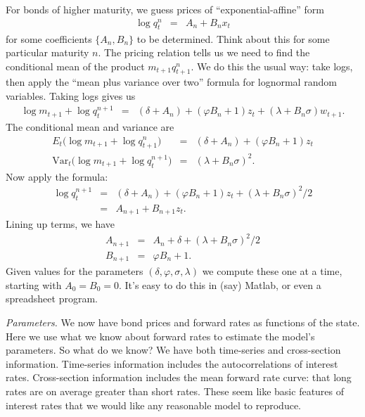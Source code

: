 \documentclass[11pt]{article}
\begin{document}
For bonds of higher maturity, we
guess prices of ``exponential-affine'' form
\begin{eqnarray*}
    \log q^n_t &=& A_n + B_n x_t
\end{eqnarray*}
for some coefficients $\{ A_n, B_n\}$ to be determined.
Think about this for some particular maturity $n$.
The pricing relation tells us we
need to find the conditional mean of the product
$m_{t+1} q^n_{t+1}$.
We do this the usual way:  take logs,
then apply the ``mean plus variance over two'' formula for
lognormal random variables.
Taking logs gives us
\begin{eqnarray*}
    \log m_{t+1} + \log q^{n+1}_t &=&
            (\delta + A_n) + (\varphi B_n +1) z_t + (\lambda + B_n \sigma) w_{t+1} .
\end{eqnarray*}
The conditional mean and variance are
\begin{eqnarray*}
   E_t \big( \log m_{t+1} + \log q^{n}_{t+1} \big) &=&
            (\delta + A_n) + (\varphi B_n + 1) z_t \\
   \mbox{Var}_t \big( \log m_{t+1} + \log q^{n+1}_t \big) &=&
            (\lambda + B_n \sigma)^2 .
\end{eqnarray*}
Now apply the formula:
\begin{eqnarray*}
    \log q^{n+1}_t &=&
            (\delta + A_n) + (\varphi B_n + 1) z_t + (\lambda + B_n \sigma)^2/2 \\
                &=& A_{n+1} + B_{n+1} z_t.
\end{eqnarray*}
Lining up terms, we have
\begin{eqnarray*}
    A_{n+1} &=& A_n + \delta + (\lambda + B_n\sigma)^2/2 \\
    B_{n+1} &=& \varphi B_n + 1 .
\end{eqnarray*}
Given values for the parameters $(\delta, \varphi, \sigma, \lambda)$
we compute these one at a time,
starting with $A_0 = B_0 = 0$.
It's easy to do this in (say) Matlab, or even a spreadsheet program.

{\it Parameters.\/}
We now have bond prices and forward rates as functions of the state.
Here we use what we know about forward rates
to estimate the model's parameters.
So what do we know?
We have both time-series and cross-section information.
Time-series information includes the autocorrelations
of interest rates.
Cross-section information includes the mean forward rate curve:
that long rates are on average greater than short rates.
These seem like basic features of interest rates that
we would like any reasonable model to reproduce.
\end{document}
